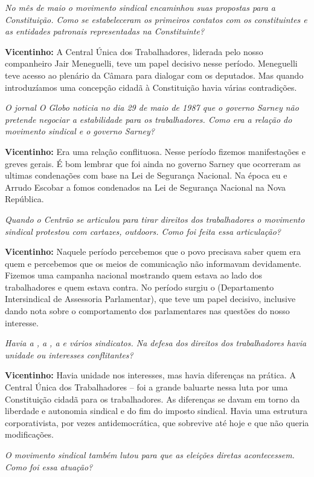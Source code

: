 \emph{No mês de maio o movimento sindical encaminhou suas propostas
para a Constituição. Como se estabeleceram os primeiros contatos com os
constituintes e as entidades patronais representadas na Constituinte?}

\textbf{Vicentinho:} A Central Única dos Trabalhadores, liderada pelo
nosso companheiro Jair Meneguelli, teve um papel decisivo nesse período.
Meneguelli teve acesso ao plenário da Câmara para dialogar com os
deputados. Mas quando introduzíamos uma concepção cidadã à Constituição
havia várias contradições.

\emph{O jornal O Globo noticia no dia 29 de maio de 1987 que o governo
Sarney não pretende negociar a estabilidade para os trabalhadores.
Como era a relação do movimento sindical e o governo Sarney?}

\textbf{Vicentinho:} Era uma relação conflituosa. Nesse período fizemos
manifestações e greves gerais. É bom lembrar que foi ainda no governo
Sarney que ocorreram as ultimas condenações com base na Lei de Segurança
Nacional. Na época eu e Arrudo Escobar a fomos condenados na Lei de
Segurança Nacional na Nova República.

\emph{Quando o Centrão se articulou para tirar direitos dos
trabalhadores o movimento sindical protestou com cartazes, outdoors.
Como foi feita essa articulação?}

\textbf{Vicentinho:} Naquele período percebemos que o povo precisava
saber quem era quem e percebemos que os meios de comunicação não
informavam devidamente. Fizemos uma campanha nacional mostrando quem
estava ao lado dos trabalhadores e quem estava contra. No período surgiu
o  (Departamento Intersindical de Assessoria Parlamentar), que teve
um papel decisivo, inclusive dando nota sobre o comportamento dos
parlamentares nas questões do nosso interesse.

\emph{Havia a , a , a  e vários sindicatos. Na defesa dos
direitos dos trabalhadores havia unidade ou interesses conflitantes?}

\textbf{Vicentinho:} Havia unidade nos interesses, mas havia diferenças
na prática. A Central Única dos Trabalhadores --  foi a grande
baluarte nessa luta por uma Constituição cidadã para os trabalhadores.
As diferenças se davam em torno da liberdade e autonomia sindical e do
fim do imposto sindical. Havia uma estrutura corporativista, por vezes
antidemocrática, que sobrevive até hoje e que não queria modificações.

\emph{O movimento sindical também lutou para que as eleições diretas
acontecessem. Como foi essa atuação?}

